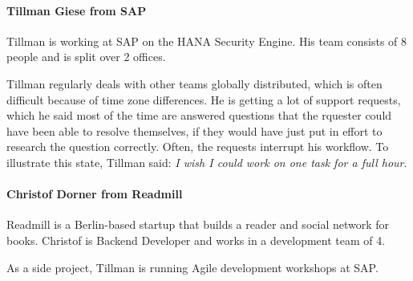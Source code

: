 \paragraph{Tillman Giese from SAP}
Tillman is working at SAP on the HANA Security Engine. His team consists of 8 people and is split over 2 offices.

Tillman regularly deals with other teams globally distributed, which is often difficult because of time zone differences. He is getting a lot of support requests, which he said most of the time are answered questions that the rquester could have been able to resolve themselves, if they would have just put in effort to research the question correctly. Often, the requests interrupt his workflow. To illustrate this state, Tillman said: \emph{I wish I could work on one task for a full hour}.

\paragraph{Christof Dorner from Readmill}
Readmill is a Berlin-based startup that builds a reader and social network for books. Christof is Backend Developer and works in a development team of 4.



As a side project, Tillman is running Agile development workshops at SAP.
